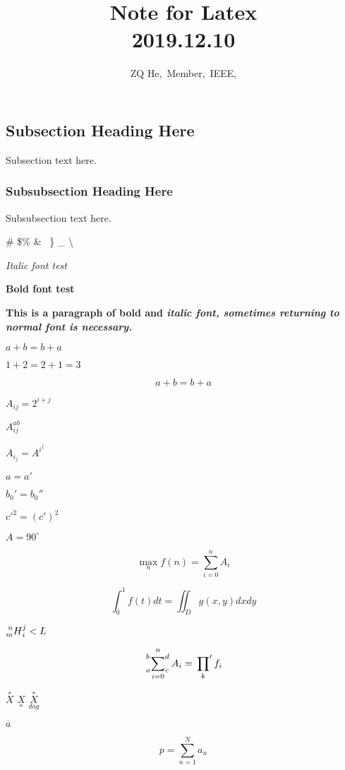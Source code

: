 \documentclass[10pt,journal,compsoc]{IEEEtran}
\begin{document}
	\title{Note for Latex\\ 2019.12.10 }

	\author{ZQ He,~Member,~IEEE,}

	\subsection{Subsection Heading Here}
	Subsection text here.


	\subsubsection{Subsubsection Heading Here}
	Subsubsection text here.

	\# \quad \$\quad \% \quad \& \quad \ \quad \} \quad \_ \quad \textbackslash

	\textit{Italic font test}

	{\bfseries Bold font test}


	\sffamily
	\textbf {This is a paragraph of bold and \textit{italic font, sometimes returning to \textnormal{normal font} is necessary.}}

	$a+b=b+a$

	$1+2=2+1=3$

	\begin{equation}
		a+b=b+a \label{eq:commutative}
	\end{equation}

	$A_{ij}=2^{i+j}$

	$A_{ij}^{ab}$\qquad

	$A_{i_j}=A^{i^j}$

	$a = a'$\qquad

	$b_0' = b_0''$\qquad

	${c'}^2 = (c')^2$


	$A=90^\circ$

	\[
	\max_n f(n) = \sum_{i=0}^n A_i
	\]

	\[
	\int_0^1 f(t) {d} t= \iint_D g(x,y) {d} x {d} y
	\]


	$\prescript{n}{m}{H}_i^j<L$

	\[\sideset{_a^b}{_c^d} \sum_{i=0}^{n} A_i = \sideset{}{'} \prod_k f_i
	\]

	$\overset{*}{X}$ \qquad
	$\underset{*}{X}$ \qquad
	$\overset{*}{\underset{dag}{X}}$

	$\overline{a}$

	\begin{equation*}
		p = \sum\limits_{n=1}^N a_n
	\end{equation*}
\end{document}

